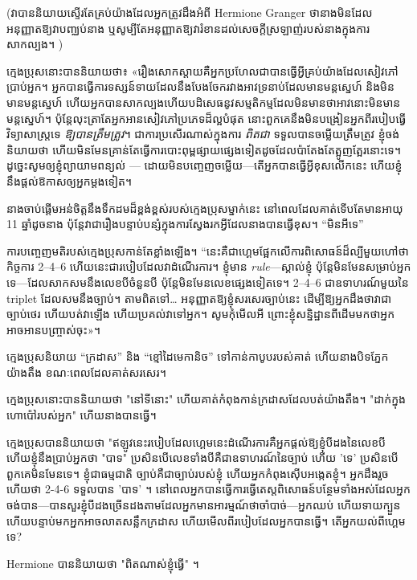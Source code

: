 (វាបាននិយាយស្ទើរតែគ្រប់យ៉ាងដែលអ្នកត្រូវដឹងអំពី Hermione Granger ថានាងមិនដែលអនុញ្ញាតឱ្យវាបញ្ឈប់នាង ឬសូម្បីតែអនុញ្ញាតឱ្យវារំខានដល់សេចក្តីស្រឡាញ់របស់នាងក្នុងការសាកល្បង។ )

ក្មេង​ប្រុស​នោះ​បាន​និយាយ​ថា​៖ «​រឿង​សោក​ស្តាយ​គឺ​អ្នក​ប្រហែល​ជា​បាន​ធ្វើ​អ្វី​គ្រប់​យ៉ាង​ដែល​សៀវភៅ​ប្រាប់​អ្នក​។ អ្នក​បាន​ធ្វើ​ការ​ទស្សន៍ទាយ​ដែល​នឹង​បែងចែក​រវាង​អាវ​ទ្រនាប់​ដែល​មាន​មន្ត​ស្នេហ៍ និង​មិន​មាន​មន្ត​ស្នេហ៍ ហើយ​អ្នក​បាន​សាកល្បង​ហើយ​បដិសេធ​នូវ​សម្មតិកម្ម​ដែល​មិន​មាន​ថា​អាវ​នោះ​មិន​មាន​មន្ត​ស្នេហ៍។ ប៉ុន្តែលុះត្រាតែអ្នកអានសៀវភៅប្រភេទដ៏ល្អបំផុត នោះពួកគេនឹងមិនបង្រៀនអ្នកពីរបៀបធ្វើវិទ្យាសាស្ត្រទេ \emph{ឱ្យបានត្រឹមត្រូវ}។ ជាការប្រសើរណាស់ក្នុងការ \emph{ពិតជា} ទទួលបានចម្លើយត្រឹមត្រូវ ខ្ញុំចង់និយាយថា ហើយមិនមែនគ្រាន់តែធ្វើការបោះពុម្ពផ្សាយផ្សេងទៀតដូចដែលប៉ាតែងតែត្អូញត្អែរនោះទេ។ ដូច្នេះ​សូម​ឲ្យ​ខ្ញុំ​ព្យាយាម​ពន្យល់ — ដោយ​មិន​បញ្ចេញ​ចម្លើយ—តើ​អ្នក​បាន​ធ្វើ​អ្វី​ខុស​លើក​នេះ ហើយ​ខ្ញុំ​នឹង​ផ្តល់​ឱកាស​ឲ្យ​អ្នក​ម្តង​ទៀត។

នាងចាប់ផ្តើមអន់ចិត្តនឹងទឹកដមដ៏ខ្ពង់ខ្ពស់របស់ក្មេងប្រុសម្នាក់នេះ នៅពេលដែលគាត់ទើបតែមានអាយុ 11 ឆ្នាំដូចនាង ប៉ុន្តែវាជារឿងបន្ទាប់បន្សំក្នុងការស្វែងរកអ្វីដែលនាងបានធ្វើខុស។ “មិនអីទេ”

ការបញ្ចេញមតិរបស់ក្មេងប្រុសកាន់តែខ្លាំងឡើង។ “នេះគឺជាហ្គេមផ្អែកលើការពិសោធន៍ដ៏ល្បីមួយហៅថា កិច្ចការ 2–4–6 ហើយនេះជារបៀបដែលវាដំណើរការ។ ខ្ញុំមាន \emph{rule}—ស្គាល់ខ្ញុំ ប៉ុន្តែមិនមែនសម្រាប់អ្នកទេ—ដែលសាកសមនឹងលេខបីចំនួនបី ប៉ុន្តែមិនមែនលេខផ្សេងទៀតទេ។ 2–4–6 ជា​ឧទាហរណ៍​មួយ​នៃ triplet ដែល​សម​នឹង​ច្បាប់។ តាមពិតទៅ… អនុញ្ញាតឱ្យខ្ញុំសរសេរច្បាប់នេះ ដើម្បីឱ្យអ្នកដឹងថាវាជាច្បាប់ថេរ ហើយបត់វាឡើង ហើយប្រគល់វាទៅអ្នក។ សូម​កុំ​មើល​អី ព្រោះ​ខ្ញុំ​សន្និដ្ឋាន​ពី​ដើម​មក​ថា​អ្នក​អាច​អាន​បញ្ច្រាស់​ចុះ»។

ក្មេងប្រុសនិយាយ “ក្រដាស” និង “ខ្មៅដៃមេកានិច” ទៅកាន់កាបូបរបស់គាត់ ហើយនាងបិទភ្នែកយ៉ាងតឹង ខណៈពេលដែលគាត់សរសេរ។

ក្មេងប្រុសនោះបាននិយាយថា "នៅទីនោះ" ហើយគាត់កំពុងកាន់ក្រដាសដែលបត់យ៉ាងតឹង។ "ដាក់ក្នុងហោប៉ៅរបស់អ្នក" ហើយនាងបានធ្វើ។

ក្មេងប្រុសបាននិយាយថា "ឥឡូវនេះរបៀបដែលហ្គេមនេះដំណើរការគឺអ្នកផ្តល់ឱ្យខ្ញុំបីដងនៃលេខបី ហើយខ្ញុំនឹងប្រាប់អ្នកថា "បាទ" ប្រសិនបើលេខទាំងបីគឺជាឧទាហរណ៍នៃច្បាប់ ហើយ 'ទេ' ប្រសិនបើ ពួកគេមិនមែនទេ។ ខ្ញុំជាធម្មជាតិ ច្បាប់គឺជាច្បាប់របស់ខ្ញុំ ហើយអ្នកកំពុងស៊ើបអង្កេតខ្ញុំ។ អ្នកដឹងរួចហើយថា 2-4-6 ទទួលបាន 'បាទ' ។ នៅពេលអ្នកបានធ្វើការធ្វើតេស្តពិសោធន៍បន្ថែមទាំងអស់ដែលអ្នកចង់បាន—បានសួរខ្ញុំបីដងច្រើនដងតាមដែលអ្នកមានអារម្មណ៍ថាចាំបាច់—អ្នកឈប់ ហើយទាយក្បួន ហើយបន្ទាប់មកអ្នកអាចលាតសន្លឹកក្រដាស ហើយមើលពីរបៀបដែលអ្នកបានធ្វើ។ តើអ្នកយល់ពីហ្គេមទេ?

Hermione បាននិយាយថា "ពិតណាស់ខ្ញុំធ្វើ" ។


